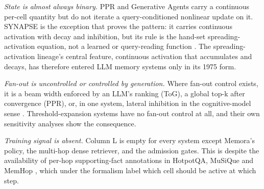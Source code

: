 \documentclass[11pt]{article}
\begin{document}
\emph{State is almost always binary.} PPR and Generative Agents carry a continuous per-cell quantity but do not iterate a query-conditioned nonlinear update on it. SYNAPSE is the exception that proves the pattern: it carries continuous activation with decay and inhibition, but its rule is the hand-set spreading-activation equation, not a learned or query-reading function \cite{synapse}. The spreading-activation lineage's central feature, continuous activation that accumulates and decays, has therefore entered LLM memory systems only in its 1975 form.

\emph{Fan-out is uncontrolled or controlled by generation.} Where fan-out control exists, it is a beam width enforced by an LLM's ranking (ToG), a global top-k after convergence (PPR), or, in one system, lateral inhibition in the cognitive-model sense \cite{synapse}. Threshold-expansion systems have no fan-out control at all, and their own sensitivity analyses show the consequence.

\emph{Training signal is absent.} Column L is empty for every system except Memora's policy, the multi-hop dense retriever, and the admission gates. This is despite the availability of per-hop supporting-fact annotations in HotpotQA, MuSiQue and MemHop \cite{hotpotqa,musique,prograph}, which under the formalism label which cell should be active at which step.
\end{document}
